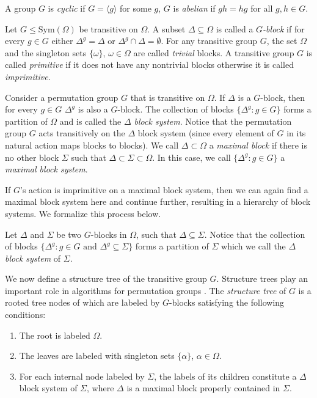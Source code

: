 \documentclass[11pt]{article}
\renewcommand{\angle}[1]{\langle #1\rangle}
\newcommand{\Sym}[1]{\ensuremath{\mathrm{Sym}\left({#1}\right)}}
\begin{document}
A group $G$ is \emph{cyclic} if $G=\angle{g}$ for some $g$, $G$ is
\emph{abelian} if $gh=hg$ for all $g, h\in G$.

Let $G\leq\Sym{\Omega}$ be transitive on $\Omega$. A subset $\Delta
\subseteq \Omega$ is called a \emph{$G$-block} if for every $g \in G$
either $\Delta^g = \Delta$ or $\Delta^g \cap \Delta = \emptyset$. For
any transitive group $G$, the set $\Omega$ and the singleton sets $\{
\omega \}$, $\omega \in \Omega$ are called \emph{trivial} blocks. A
transitive group $G$ is called \emph{primitive} if it does not have
any nontrivial blocks otherwise it is called \emph{imprimitive}.

Consider a permutation group $G$ that is transitive on $\Omega$. If
$\Delta$ is a $G$-block, then for every $g \in G$ $\Delta^g$ is also a
$G$-block. The collection of blocks $\{ \Delta^g : g \in G\}$ forms a
partition of $\Omega$ and is called the \emph{$\Delta$ block system}.
Notice that the permutation group $G$ acts transitively on the
$\Delta$ block system (since every element of $G$ in its natural
action maps blocks to blocks). We call $\Delta\subset\Omega$ a
\emph{maximal block} if there is no other block $\Sigma$ such that
$\Delta\subset\Sigma\subset\Omega$. In this case, we call $\{ \Delta^g
: g \in G\}$ a \emph{maximal block system}.

If $G$'s action is imprimitive on a maximal block system, then we can
again find a maximal block system here and continue further, resulting
in a hierarchy of block systems. We formalize this process below.

Let $\Delta$ and $\Sigma$ be two $G$-blocks in $\Omega$, such that
$\Delta \subseteq \Sigma$. Notice that the collection of blocks $\{
\Delta^g : g \in G \textrm{ and } \Delta^g \subseteq \Sigma \}$ forms
a partition of $\Sigma$ which we call the \emph{$\Delta$ block system}
of $\Sigma$.

We now define a structure tree of the transitive group $G$.  Structure
trees play an important role in algorithms for permutation groups
\cite{Lu93}. The \emph{structure tree} of $G$ is a rooted tree nodes
of which are labeled by $G$-blocks satisfying the following
conditions:

\begin{enumerate} 
\item The root is labeled $\Omega$.  
\item The leaves are labeled with singleton sets $\{ \alpha\}$, 
$\alpha \in \Omega$.
\item For each internal node labeled by $\Sigma$, the labels of its
children constitute a $\Delta$ block system of $\Sigma$, where
$\Delta$ is a maximal block properly contained in $\Sigma$.
\end{enumerate}
\end{document}
